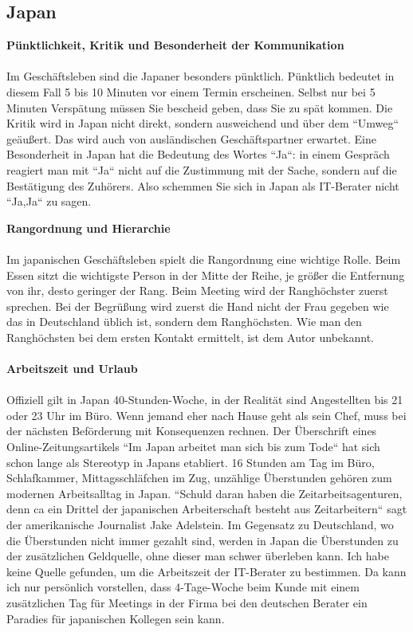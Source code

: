 	\subsection{Japan}
	\textbf{Pünktlichkeit, Kritik und Besonderheit der Kommunikation}\\
	\\
	Im Geschäftsleben sind die Japaner besonders pünktlich. Pünktlich bedeutet in diesem Fall 5 bis 10 Minuten vor einem Termin erscheinen. Selbst nur bei 5 Minuten Verspätung müssen Sie bescheid geben, dass Sie zu spät kommen.
	Die Kritik wird in Japan nicht direkt, sondern ausweichend und über dem ``Umweg`` geäußert. Das wird auch von ausländischen Geschäftspartner erwartet. Eine Besonderheit in Japan hat die Bedeutung des Wortes ``Ja``: in einem Gespräch reagiert man mit ``Ja`` nicht auf die Zustimmung mit der Sache, sondern auf die Bestätigung des Zuhörers. Also schemmen Sie sich in Japan als IT-Berater nicht  ``Ja,Ja`` zu sagen.

	\textbf{Rangordnung und Hierarchie}\\
	\\
	Im japanischen Geschäftsleben spielt die Rangordnung eine wichtige Rolle.
	Beim Essen sitzt die wichtigste Person in der Mitte der Reihe, je größer die Entfernung von ihr, desto geringer der Rang.	%
	Beim Meeting wird der Ranghöchster zuerst sprechen. Bei der Begrüßung wird zuerst die Hand nicht der Frau gegeben wie das in Deutschland üblich ist, sondern dem Ranghöchsten. Wie man den Ranghöchsten bei dem ersten Kontakt ermittelt, ist dem Autor unbekannt.\\
	\\
	\textbf{Arbeitszeit und Urlaub}\\
	\\
	Offiziell gilt in Japan 40-Stunden-Woche, in der Realität sind Angestellten bis 21 oder 23 Uhr im Büro. Wenn jemand eher nach Hause geht als sein Chef, muss bei der nächsten Beförderung mit Konsequenzen rechnen.
	Der Überschrift eines Online-Zeitungsartikels ``Im Japan arbeitet man sich bis zum Tode`` hat sich schon lange als Stereotyp in Japans etabliert. 
	16 Stunden am Tag im Büro, Schlafkammer, Mittagsschläfchen im Zug, unzählige Überstunden gehören zum modernen Arbeitsalltag in Japan. ``Schuld daran haben die Zeitarbeitsagenturen, denn ca ein Drittel der japanischen Arbeiterschaft besteht aus Zeitarbeitern`` sagt der amerikanische Journalist Jake Adelstein. Im Gegensatz zu Deutschland, wo die Überstunden nicht immer gezahlt sind, werden in Japan die Überstunden zu der zusätzlichen Geldquelle, ohne dieser man schwer überleben kann.
	Ich habe keine Quelle gefunden, um die Arbeitszeit der IT-Berater zu bestimmen. Da kann ich nur persönlich vorstellen, dass 4-Tage-Woche beim Kunde mit einem zusätzlichen Tag für Meetings in der Firma bei den deutschen Berater ein Paradies für japanischen Kollegen sein kann. \\
	
